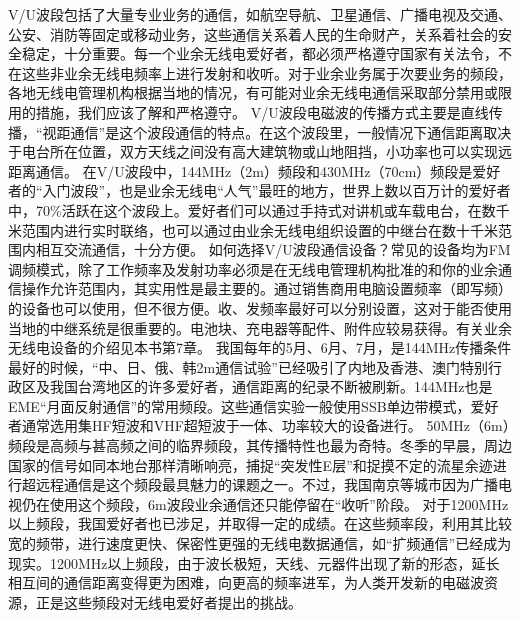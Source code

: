 \documentclass[12pt,UTF8]{ctexbook}
\begin{document}
V/U波段包括了大量专业业务的通信，如航空导航、卫星通信、广播电视及交通、公安、消防等固定或移动业务，这些通信关系着人民的生命财产，关系着社会的安全稳定，十分重要。每一个业余无线电爱好者，都必须严格遵守国家有关法令，不在这些非业余无线电频率上进行发射和收听。对于业余业务属于次要业务的频段，各地无线电管理机构根据当地的情况，有可能对业余无线电通信采取部分禁用或限用的措施，我们应该了解和严格遵守。
V/U波段电磁波的传播方式主要是直线传播，“视距通信”是这个波段通信的特点。在这个波段里，一般情况下通信距离取决于电台所在位置，双方天线之间没有高大建筑物或山地阻挡，小功率也可以实现远距离通信。
在V/U波段中，144MHz（2m）频段和430MHz（70cm）频段是爱好者的“入门波段”，也是业余无线电“人气”最旺的地方，世界上数以百万计的爱好者中，70\%活跃在这个波段上。爱好者们可以通过手持式对讲机或车载电台，在数千米范围内进行实时联络，也可以通过由业余无线电组织设置的中继台在数十千米范围内相互交流通信，十分方便。
如何选择V/U波段通信设备？常见的设备均为FM调频模式，除了工作频率及发射功率必须是在无线电管理机构批准的和你的业余通信操作允许范围内，其实用性是最主要的。通过销售商用电脑设置频率（即写频）的设备也可以使用，但不很方便。收、发频率最好可以分别设置，这对于能否使用当地的中继系统是很重要的。电池块、充电器等配件、附件应较易获得。有关业余无线电设备的介绍见本书第7章。
我国每年的5月、6月、7月，是144MHz传播条件最好的时候，“中、日、俄、韩2m通信试验”已经吸引了内地及香港、澳门特别行政区及我国台湾地区的许多爱好者，通信距离的纪录不断被刷新。144MHz也是EME“月面反射通信”的常用频段。这些通信实验一般使用SSB单边带模式，爱好者通常选用集HF短波和VHF超短波于一体、功率较大的设备进行。
50MHz（6m）频段是高频与甚高频之间的临界频段，其传播特性也最为奇特。冬季的早晨，周边国家的信号如同本地台那样清晰响亮，捕捉“突发性E层”和捉摸不定的流星余迹进行超远程通信是这个频段最具魅力的课题之一。不过，我国南京等城市因为广播电视仍在使用这个频段，6m波段业余通信还只能停留在“收听”阶段。
对于1200MHz以上频段，我国爱好者也已涉足，并取得一定的成绩。在这些频率段，利用其比较宽的频带，进行速度更快、保密性更强的无线电数据通信，如“扩频通信”已经成为现实。1200MHz以上频段，由于波长极短，天线、元器件出现了新的形态，延长相互间的通信距离变得更为困难，向更高的频率进军，为人类开发新的电磁波资源，正是这些频段对无线电爱好者提出的挑战。
\end{document}
